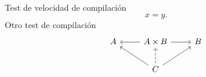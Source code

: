 \documentclass{article}
\begin{document}
Test de velocidad de compilación
\begin{equation*}
    x=y.
\end{equation*}
Otro test de compilación
\begin{equation*}
    \begin{tikzcd}
        A & A\times B\ar[r]\ar[l] & B\\
        & C\ar[ul]\ar[ru]\ar[u,dashed]
    \end{tikzcd}
\end{equation*}
\end{document}
